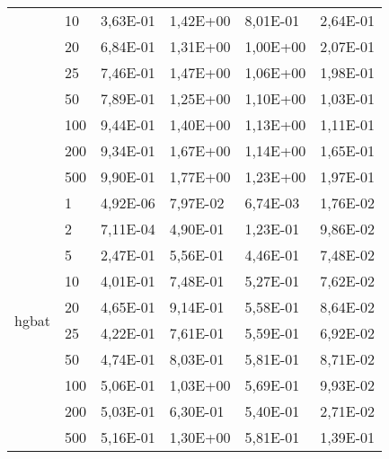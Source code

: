 \begin{longtable}[c]{|m{3.5cm}|l|l|l|l|l|}
                                        & 10        & 3,63E-01   & 1,42E+00   & 8,01E-01   & 2,64E-01  \\ \cline{2-6} 
                                        & 20        & 6,84E-01   & 1,31E+00   & 1,00E+00   & 2,07E-01  \\ \cline{2-6} 
                                        & 25        & 7,46E-01   & 1,47E+00   & 1,06E+00   & 1,98E-01  \\ \cline{2-6} 
                                        & 50        & 7,89E-01   & 1,25E+00   & 1,10E+00   & 1,03E-01  \\ \cline{2-6} 
                                        & 100       & 9,44E-01   & 1,40E+00   & 1,13E+00   & 1,11E-01  \\ \cline{2-6} 
                                        & 200       & 9,34E-01   & 1,67E+00   & 1,14E+00   & 1,65E-01  \\ \cline{2-6} 
                                        & 500       & 9,90E-01   & 1,77E+00   & 1,23E+00   & 1,97E-01  \\ \hline
\multirow{10}{*}{hgbat}                 & 1         & 4,92E-06   & 7,97E-02   & 6,74E-03   & 1,76E-02  \\ \cline{2-6} 
                                        & 2         & 7,11E-04   & 4,90E-01   & 1,23E-01   & 9,86E-02  \\ \cline{2-6} 
                                        & 5         & 2,47E-01   & 5,56E-01   & 4,46E-01   & 7,48E-02  \\ \cline{2-6} 
                                        & 10        & 4,01E-01   & 7,48E-01   & 5,27E-01   & 7,62E-02  \\ \cline{2-6} 
                                        & 20        & 4,65E-01   & 9,14E-01   & 5,58E-01   & 8,64E-02  \\ \cline{2-6} 
                                        & 25        & 4,22E-01   & 7,61E-01   & 5,59E-01   & 6,92E-02  \\ \cline{2-6} 
                                        & 50        & 4,74E-01   & 8,03E-01   & 5,81E-01   & 8,71E-02  \\ \cline{2-6} 
                                        & 100       & 5,06E-01   & 1,03E+00   & 5,69E-01   & 9,93E-02  \\ \cline{2-6} 
                                        & 200       & 5,03E-01   & 6,30E-01   & 5,40E-01   & 2,71E-02  \\ \cline{2-6} 
                                        & 500       & 5,16E-01   & 1,30E+00   & 5,81E-01   & 1,39E-01  \\ \hline

\end{longtable}
